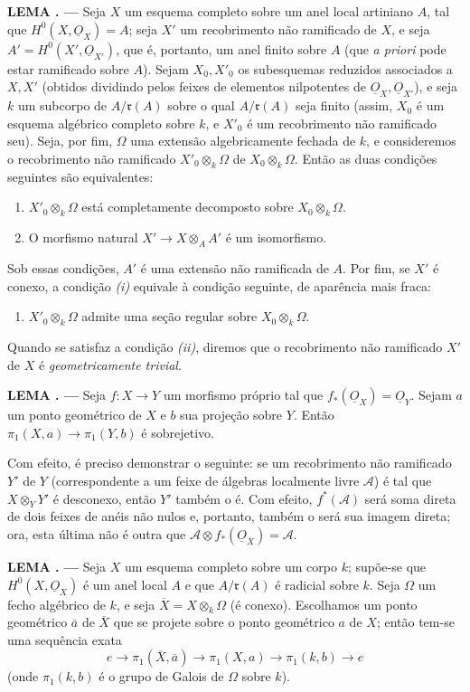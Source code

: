 \documentclass[11pt,twoside,openany]{book}
\numberwithin{equation}{section}
\newcommand{\src}[1]{%
  \phantomsection\hypertarget{src:#1}{}%
  \marginpar{\raggedleft\footnotesize\sffamily #1}%
}
\newcommand{\Osh}{\underline{O}}
\theoremstyle{plain}
\theoremstyle{definition}
\theoremstyle{remark}
\newcommand{\result}[2]{%
  \par\medskip\noindent\textbf{#1%
  \if\relax\detokenize{#2}\relax\else\space#2\fi. ---}\enspace
}
\newcommand{\FgaUnitKey}{frontmatter}
\renewcommand{\src}[1]{%
  \phantomsection\hypertarget{src:\FgaUnitKey:#1}{}%
  \marginpar{\raggedleft\footnotesize\sffamily #1}%
}
\begin{document}
\result{LEMA}{3} Seja $X$ um esquema completo sobre um anel local artiniano
$A$, tal que $H^0(X,\Osh_X)=A$; seja $X'$ um recobrimento não ramificado de $X$,
e seja $A'=H^0(X',\Osh_{X'})$, que é, portanto, um anel finito sobre $A$
(que \textit{a priori} pode estar ramificado sobre $A$). Sejam $X_0,X'_0$ os
subesquemas reduzidos associados a $X,X'$ (obtidos dividindo pelos feixes de
elementos nilpotentes de $\Osh_X,\Osh_{X'}$), e seja $k$ um subcorpo de
$A/\mathfrak r(A)$ sobre o qual $A/\mathfrak r(A)$ seja finito (assim, $X_0$ é
um esquema algébrico completo sobre $k$, e $X'_0$ é um recobrimento não
ramificado seu). Seja, por fim, $\Omega$ uma extensão algebricamente
fechada de $k$, e consideremos o recobrimento não ramificado
$X'_0\otimes_k\Omega$ de $X_0\otimes_k\Omega$. Então as duas condições
seguintes são equivalentes:
\begin{enumerate}
  \item[\textit{i.}] $X'_0\otimes_k\Omega$ está completamente decomposto
    sobre $X_0\otimes_k\Omega$.
  \item[\textit{ii.}] O morfismo natural
    $X'\longrightarrow X\otimes_A A'$ é um isomorfismo.
\end{enumerate}
Sob essas condições, $A'$ é uma extensão não ramificada de $A$. Por fim,
se $X'$ é conexo, a condição \textit{(i)} equivale à condição seguinte,
de aparência mais fraca:
\begin{enumerate}
  \item[\textit{i bis.}] $X'_0\otimes_k\Omega$ admite uma seção regular
    sobre $X_0\otimes_k\Omega$.
\end{enumerate}
Quando se satisfaz a condição \textit{(ii)}, diremos que o recobrimento não
ramificado $X'$ de $X$ é \emph{geometricamente trivial}.

\src{212}
\result{LEMA}{4} Seja $f:X\longrightarrow Y$ um morfismo próprio tal que
$f_*(\Osh_X)=\Osh_Y$. Sejam $a$ um ponto geométrico de $X$ e $b$ sua projeção
sobre $Y$. Então $\pi_1(X,a)\longrightarrow\pi_1(Y,b)$ é sobrejetivo.

Com efeito, é preciso demonstrar o seguinte: se um recobrimento não ramificado
$Y'$ de $Y$ (correspondente a um feixe de álgebras localmente livre
$\mathcal A$) é tal que $X\otimes_Y Y'$ é desconexo, então $Y'$ também o
é. Com efeito, $f^*(\mathcal A)$ será soma direta de dois feixes de anéis não
nulos e, portanto, também o será sua imagem direta; ora, esta última
não é outra que $\mathcal A\otimes f_*(\Osh_X)=\mathcal A$.

\result{LEMA}{5} Seja $X$ um esquema completo sobre um corpo $k$; supõe-se que
$H^0(X,\Osh_X)$ é um anel local $A$ e que $A/\mathfrak r(A)$ é radicial
sobre $k$. Seja $\Omega$ um fecho algébrico de $k$, e seja
$\overline X=X\otimes_k\Omega$ (é conexo). Escolhamos um ponto geométrico
$\overline a$ de $\overline X$ que se projete sobre o ponto geométrico $a$ de
$X$; então tem-se uma sequência exata
\[
  e\longrightarrow\pi_1(\overline X,\overline a)
  \longrightarrow\pi_1(X,a)
  \longrightarrow\pi_1(k,b)\longrightarrow e
\]
(onde $\pi_1(k,b)$ é o grupo de Galois de $\Omega$ sobre $k$).
\end{document}
